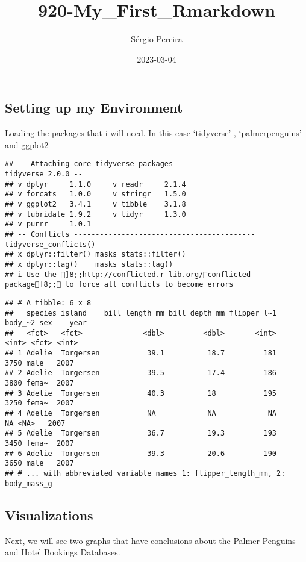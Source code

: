 \documentclass[
]{article}
\title{920-My\_First\_Rmarkdown}
\author{Sérgio Pereira}
\date{2023-03-04}
\begin{document}
\maketitle

\hypertarget{setting-up-my-environment}{%
\subsection{Setting up my Environment}\label{setting-up-my-environment}}

Loading the packages that i will need. In this case `tidyverse' ,
`palmerpenguins' and ggplot2

\begin{verbatim}
## -- Attaching core tidyverse packages ------------------------ tidyverse 2.0.0 --
## v dplyr     1.1.0     v readr     2.1.4
## v forcats   1.0.0     v stringr   1.5.0
## v ggplot2   3.4.1     v tibble    3.1.8
## v lubridate 1.9.2     v tidyr     1.3.0
## v purrr     1.0.1     
## -- Conflicts ------------------------------------------ tidyverse_conflicts() --
## x dplyr::filter() masks stats::filter()
## x dplyr::lag()    masks stats::lag()
## i Use the ]8;;http://conflicted.r-lib.org/conflicted package]8;; to force all conflicts to become errors
\end{verbatim}

\begin{verbatim}
## # A tibble: 6 x 8
##   species island    bill_length_mm bill_depth_mm flipper_l~1 body_~2 sex    year
##   <fct>   <fct>              <dbl>         <dbl>       <int>   <int> <fct> <int>
## 1 Adelie  Torgersen           39.1          18.7         181    3750 male   2007
## 2 Adelie  Torgersen           39.5          17.4         186    3800 fema~  2007
## 3 Adelie  Torgersen           40.3          18           195    3250 fema~  2007
## 4 Adelie  Torgersen           NA            NA            NA      NA <NA>   2007
## 5 Adelie  Torgersen           36.7          19.3         193    3450 fema~  2007
## 6 Adelie  Torgersen           39.3          20.6         190    3650 male   2007
## # ... with abbreviated variable names 1: flipper_length_mm, 2: body_mass_g
\end{verbatim}

\hypertarget{visualizations}{%
\subsection{Visualizations}\label{visualizations}}

Next, we will see two graphs that have conclusions about the Palmer
Penguins and Hotel Bookings Databases.
\end{document}
